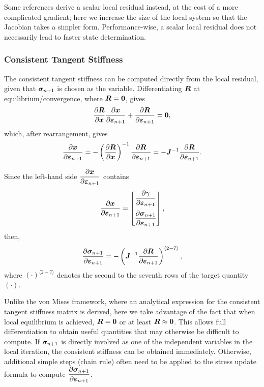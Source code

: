 Some references derive a scalar local residual instead, at the cost of a more complicated gradient; here we increase the size of the local system so that the Jacobian takes a simpler form.
Performance-wise, a scalar local residual does not necessarily lead to faster state determination.
\subsubsection{Consistent Tangent Stiffness}
The consistent tangent stiffness can be computed directly from the local residual, given that $\bm{\sigma}_{n+1}$ is chosen as the variable.
Differentiating $\bm{R}$ at equilibrium/convergence, where $\bm{R}=\bm{0}$, gives
\begin{gather}\label{eq:universal_consistent_tangent}
    \dfrac{\partial{\bm{R}}}{\partial{\bm{x}}}\dfrac{\partial{\bm{x}}}{\partial{\bm{\varepsilon}_{n+1}}}+\dfrac{\partial{\bm{R}}}{\partial{\bm{\varepsilon}_{n+1}}}=\bm{0},
\end{gather}
which, after rearrangement, gives
\begin{gather}
    \dfrac{\partial{\bm{x}}}{\partial{\bm{\varepsilon}_{n+1}}}=-\left(\dfrac{\partial{\bm{R}}}{\partial{\bm{x}}}\right)^{-1}\dfrac{\partial{\bm{R}}}{\partial{\bm{\varepsilon}_{n+1}}}=-\bm{J}^{-1}\dfrac{\partial{\bm{R}}}{\partial{\bm{\varepsilon}_{n+1}}}.
\end{gather}

Since the left-hand side $\dfrac{\partial{\bm{x}}}{\partial{\bm{\varepsilon}_{n+1}}}$ contains
\begin{gather}
    \dfrac{\partial{\bm{x}}}{\partial{\bm{\varepsilon}_{n+1}}}=\begin{bmatrix}
        \dfrac{\partial{\gamma}}{\partial{\bm{\varepsilon}_{n+1}}} \\[4mm]
        \dfrac{\partial{\bm{\sigma}_{n+1}}}{\partial{\bm{\varepsilon}_{n+1}}}
    \end{bmatrix},
\end{gather}
then,
\begin{gather}\label{eq:ortho_consistent_tangent}
    \dfrac{\partial{\bm{\sigma}_{n+1}}}{\partial{\bm{\varepsilon}_{n+1}}}=-\left(\bm{J}^{-1}\dfrac{\partial{\bm{R}}}{\partial{\bm{\varepsilon}_{n+1}}}\right)^{\langle2-7\rangle},
\end{gather}
where $\left(\cdot\right)^{\langle2-7\rangle}$ denotes the second to the seventh rows of the target quantity $\left(\cdot\right)$.

Unlike the von Mises framework, where an analytical expression for the consistent tangent stiffness matrix is derived, here we take advantage of the fact that when local equilibrium is achieved, $\bm{R}=\bm{0}$ or at least $\bm{R}\approx\bm{0}$.
This allows full differentiation to obtain useful quantities that may otherwise be difficult to compute.
If $\bm{\sigma}_{n+1}$ is directly involved as one of the independent variables in the local iteration, the consistent stiffness can be obtained immediately.
Otherwise, additional simple steps (chain rule) often need to be applied to the stress update formula to compute $\dfrac{\partial{\bm{\sigma}_{n+1}}}{\partial{\bm{\varepsilon}_{n+1}}}$.

